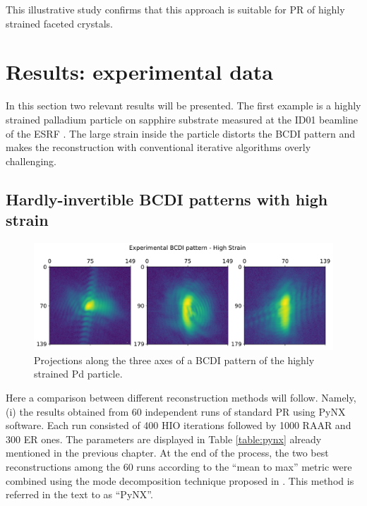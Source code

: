 This illustrative study confirms that this approach is suitable for PR of highly strained faceted crystals. 

\section{Results: experimental data}

In this section two relevant results will be presented. The first example is a highly strained palladium particle on 
sapphire substrate measured at the ID01 beamline of the ESRF \cite{bellec2026ultrafast}. 
The large strain inside the particle distorts the BCDI pattern and makes the reconstruction with conventional iterative 
algorithms overly challenging. 

\subsection{Hardly-invertible BCDI patterns with high strain}

\begin{figure}[H]
  \centering
  \includegraphics[width=\textwidth]{figures/AD/AD_exp3_michael.pdf}
  \caption{Projections along the three axes of a BCDI pattern of the highly strained Pd particle. }
  \label{fig:projections_michael}
\end{figure}

Here a comparison between different reconstruction methods will follow. Namely, (i) the results obtained 
from 60 independent runs of standard PR using PyNX software. Each run consisted of 400 HIO iterations followed by 1000 RAAR and 
300 ER ones. The parameters are displayed in Table \ref{table:pynx} already mentioned in the previous chapter. 
At the end of the process, the two best reconstructions among the 60 runs according to the ``mean to max'' metric 
were combined using the mode decomposition technique proposed in \cite{favre-nicolin_free_2020}. 
This method is referred in the text to as ``PyNX''. 
  
